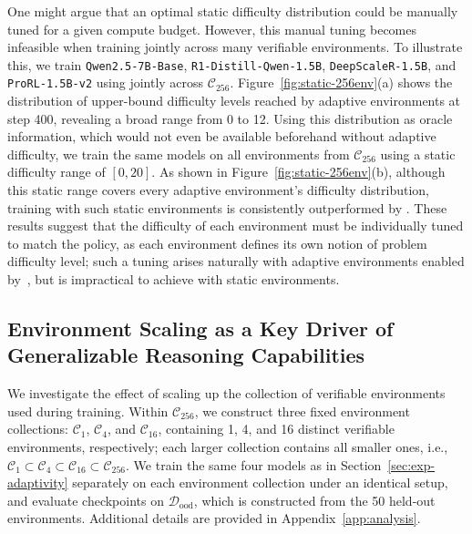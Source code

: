 \documentclass{article}
\theoremstyle{plain}
\theoremstyle{definition}
\theoremstyle{remark}
\begin{document}
One might argue that an optimal static difficulty distribution could be manually tuned for a given compute budget.
However, this manual tuning becomes infeasible when training jointly across many verifiable environments.
To illustrate this, we train \texttt{Qwen2.5-7B-Base}, \texttt{R1-Distill-Qwen-1.5B}, \texttt{DeepScaleR-1.5B}, and \texttt{ProRL-1.5B-v2} using \ours{} jointly across $\mathcal{C}_{256}$.
Figure~\ref{fig:static-256env}(a) shows the distribution of upper-bound difficulty levels reached by adaptive environments at step 400, revealing a broad range from 0 to 12.
Using this distribution as oracle information, which would not even be available beforehand without adaptive difficulty, we train the same models on all environments from $\mathcal{C}_{256}$ using a static difficulty range of $[0, 20]$.
As shown in Figure~\ref{fig:static-256env}(b), although this static range covers every adaptive environment’s difficulty distribution, training with such static environments is consistently outperformed by \ours{}.
These results suggest that the difficulty of each environment must be individually tuned to match the policy, as each environment defines its own notion of problem difficulty level;
such a tuning arises naturally with adaptive environments enabled by~\ours{}, but is impractical to achieve with static environments.








\subsection{Environment Scaling as a Key Driver of Generalizable Reasoning Capabilities}
\label{sec:env-scaling}
We investigate the effect of scaling up the collection of verifiable environments used during training.
Within $\mathcal{C}_{256}$, we construct three fixed environment collections: $\mathcal{C}_1$, $\mathcal{C}_4$, and $\mathcal{C}_{16}$, containing 1, 4, and 16 distinct verifiable environments, respectively;
each larger collection contains all smaller ones, i.e., $\mathcal{C}_1 \subset \mathcal{C}_4 \subset \mathcal{C}_{16} \subset \mathcal{C}_{256}$.
We train the same four models as in Section~\ref{sec:exp-adaptivity} separately on each environment collection under an identical setup, and evaluate checkpoints on $\mathcal{D}_{\text{ood}}$, which is constructed from the 50 held-out environments.
Additional details are provided in Appendix~\ref{app:analysis}.
\end{document}
